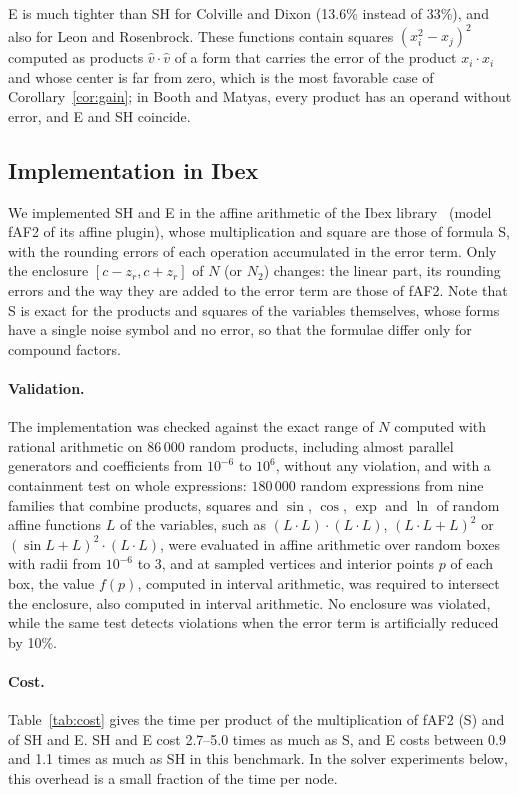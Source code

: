 \documentclass[11pt]{article}
\theoremstyle{definition}
\begin{document}
E is much tighter than SH for Colville and Dixon (13.6\% instead of 33\%), and also for Leon and Rosenbrock. These functions contain squares $(x_i^2-x_j)^2$ computed as products $\hat v\cdot\hat v$ of a form that carries the error of the product $x_i\cdot x_i$ and whose center is far from zero, which is the most favorable case of Corollary~\ref{cor:gain}; in Booth and Matyas, every product has an operand without error, and E and SH coincide.


\subsection{Implementation in Ibex}
\label{sec:ibex}

We implemented SH and E in the affine arithmetic of the Ibex library~\cite{chabert2009,ibexaffine} (model fAF2 of its affine plugin), whose multiplication and square are those of formula S, with the rounding errors of each operation accumulated in the error term. Only the enclosure $[c-z_r,c+z_r]$ of $N$ (or $N_2$) changes: the linear part, its rounding errors and the way they are added to the error term are those of fAF2. Note that S is exact for the products and squares of the variables themselves, whose forms have a single noise symbol and no error, so that the formulae differ only for compound factors.

\paragraph{Validation.} The implementation was checked against the exact range of $N$ computed with rational arithmetic on 86\,000 random products, including almost parallel generators and coefficients from $10^{-6}$ to $10^6$, without any violation, and with a containment test on whole expressions: $180\,000$ random expressions from nine families that combine products, squares and $\sin$, $\cos$, $\exp$ and $\ln$ of random affine functions $L$ of the variables, such as $(L\cdot L)\cdot(L\cdot L)$, $(L\cdot L+L)^2$ or $(\sin L+L)^2\cdot(L\cdot L)$, were evaluated in affine arithmetic over random boxes with radii from $10^{-6}$ to $3$, and at sampled vertices and interior points $p$ of each box, the value $f(p)$, computed in interval arithmetic, was required to intersect the enclosure, also computed in interval arithmetic. No enclosure was violated, while the same test detects violations when the error term is artificially reduced by 10\%.

\paragraph{Cost.} Table~\ref{tab:cost} gives the time per product of the multiplication of fAF2 (S) and of SH and E. SH and E cost 2.7--5.0 times as much as S, and E costs between 0.9 and 1.1 times as much as SH in this benchmark. In the solver experiments below, this overhead is a small fraction of the time per node.
\end{document}
